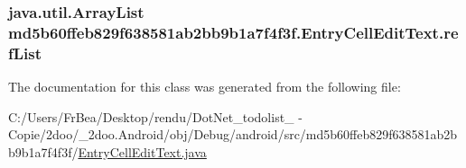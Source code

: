 \hypertarget{classmd5b60ffeb829f638581ab2bb9b1a7f4f3f_1_1_entry_cell_edit_text_2f5977b580ca5011d855f06a7ba1101b}{
\subsubsection[{refList}]{\setlength{\rightskip}{0pt plus 5cm}java.util.ArrayList {\bf md5b60ffeb829f638581ab2bb9b1a7f4f3f.EntryCellEditText.refList}}}
\label{classmd5b60ffeb829f638581ab2bb9b1a7f4f3f_1_1_entry_cell_edit_text_2f5977b580ca5011d855f06a7ba1101b}




The documentation for this class was generated from the following file:\begin{CompactItemize}
\item 
C:/Users/FrBea/Desktop/rendu/DotNet\_\-todolist\_ - Copie/2doo/\_\-2doo.Android/obj/Debug/android/src/md5b60ffeb829f638581ab2bb9b1a7f4f3f/\hyperlink{_entry_cell_edit_text_8java}{EntryCellEditText.java}\end{CompactItemize}
